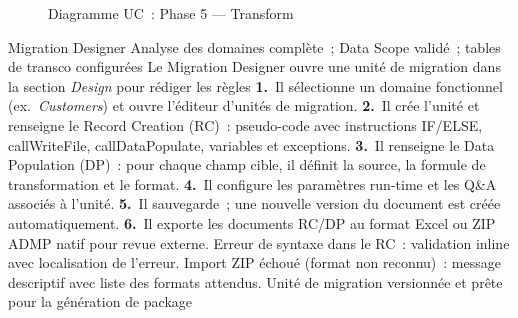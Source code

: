 \begin{figure}[H]
\centering
{}
\caption{Diagramme UC~: Phase 5 — Transform}
\label{fig:uc-phase5}
\end{figure}

  {Migration Designer}
  {Analyse des domaines complète~; Data Scope validé~; tables de transco configurées}
  {Le Migration Designer ouvre une unité de migration dans la section \textit{Design} pour rédiger les règles}
  {\textbf{1.}~Il sélectionne un domaine fonctionnel (ex.~\textit{Customers}) et ouvre l'éditeur d'unités de migration.\newline
   \textbf{2.}~Il crée l'unité et renseigne le Record Creation (RC)~: pseudo-code avec instructions IF/ELSE, callWriteFile, callDataPopulate, variables et exceptions.\newline
   \textbf{3.}~Il renseigne le Data Population (DP)~: pour chaque champ cible, il définit la source, la formule de transformation et le format.\newline
   \textbf{4.}~Il configure les paramètres run-time et les Q\&A associés à l'unité.\newline
   \textbf{5.}~Il sauvegarde~; une nouvelle version du document est créée automatiquement.\newline
   \textbf{6.}~Il exporte les documents RC/DP au format Excel ou ZIP ADMP natif pour revue externe.}
  {Erreur de syntaxe dans le RC~: validation inline avec localisation de l'erreur. Import ZIP échoué (format non reconnu)~: message descriptif avec liste des formats attendus.}
  {Unité de migration versionnée et prête pour la génération de package}

